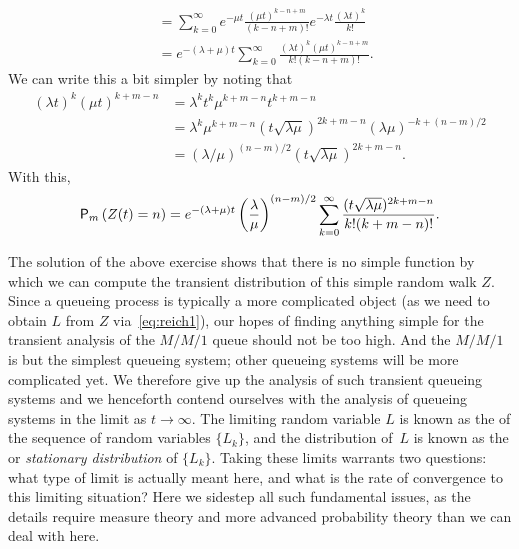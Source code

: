\begin{exercise}
\begin{solution}
\begin{equation}
\begin{split}
&= \sum_{k=0}^\infty e^{-\mu t} \frac{(\mu t)^{k -n+m}}{(k-n +m)!} e^{-\lambda t} \frac{(\lambda t)^k}{k!} \\
&= e^{-(\lambda+\mu)t} \sum_{k=0}^\infty \frac{(\lambda t)^k(\mu t)^{k  -n + m }}{k!(k-n+m)!}.
  \end{split}
\end{equation}
We can write this a bit simpler by noting that
\begin{align*}
  (\lambda t)^k (\mu t) ^{k + m - n}  
&=  \lambda^k t^k\mu^{k + m - n} t^{k+m-n} \\
&= \lambda^k \mu^{k + m - n} (t\sqrt{\lambda \mu})^{2k+m-n} (\lambda\mu)^{-k + (n-m)/2} \\
&= (\lambda/\mu)^{(n-m)/2} (t\sqrt{\lambda \mu})^{2k+m-n}.
\end{align*}
With this,
\begin{equation*}
    \P{Z(t)=n}_m 
= e^{-(\lambda+\mu)t} \left(\frac\lambda\mu\right)^{(n-m)/2} \sum_{k=0}^\infty 
\frac{(t\sqrt{\lambda\mu} )^{2k+m-n}}{k!(k+m-n)!}.
\end{equation*}
\end{solution}
\end{exercise}


The solution of the above exercise shows that there is no simple function by which we can compute the transient distribution of this simple random walk $Z$.
Since a queueing process is typically a more complicated object (as we need to obtain $L$ from $Z$ via~\cref{eq:reich1}), our hopes of finding anything simple for the transient analysis of the $M/M/1$ queue should not be too high.
And the $M/M/1$ is but the simplest queueing system; other queueing systems will be more complicated yet.
We therefore give up the analysis of such transient queueing systems and we henceforth contend ourselves with the analysis of queueing systems in the limit as $t\to\infty$.
The limiting random variable $L$ is known as the  of the sequence of random variables $\{L_k\}$, and the distribution of~$L$ is known as the  or \emph{stationary distribution} of $\{L_k\}$.
Taking these limits warrants two questions: what type of limit is actually meant here, and what is the rate of convergence to this limiting situation?
Here we sidestep all such fundamental issues, as the details require measure theory and more advanced probability theory than we can deal with here.


